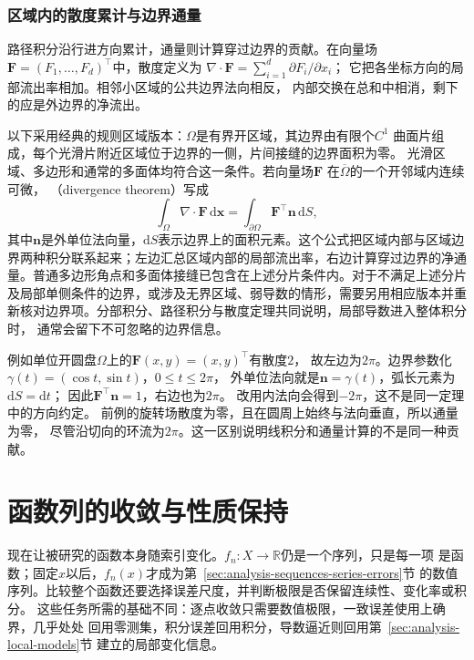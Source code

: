 \subsubsection{区域内的散度累计与边界通量}
路径积分沿行进方向累计，通量则计算穿过边界的贡献。在向量场
$\bm F=(F_1,\ldots,F_d)^\top$中，散度定义为
$\nabla\mathbin{\cdot}\bm F=\sum_{i=1}^d\partial F_i/\partial x_i$；
它把各坐标方向的局部流出率相加。相邻小区域的公共边界法向相反，
内部交换在总和中相消，剩下的应是外边界的净流出。

以下采用经典的规则区域版本：$\Omega$是有界开区域，其边界由有限个$C^1$
曲面片组成，每个光滑片附近区域位于边界的一侧，片间接缝的边界面积为零。
光滑区域、多边形和通常的多面体均符合这一条件。若向量场$\bm{F}$
在$\overline{\Omega}$的一个开邻域内连续可微，
（divergence theorem）写成
\begin{equation}
  \int_{\Omega}\nabla\mathbin{\cdot}\bm{F}\,\mathrm{d}\bm{x}
  =
  \int_{\partial\Omega}\bm{F}^{\top}\bm{n}\,\mathrm{d}S,
\label{eq:analysis-divergence-theorem}
\end{equation}
其中$\bm{n}$是外单位法向量，$\mathrm dS$表示边界上的面积元素。这个公式把区域内部与区域边界两种积分联系起来；左边汇总区域内部的局部流出率，右边计算穿过边界的净通量。普通多边形角点和多面体接缝已包含在上述分片条件内。对于不满足上述分片及局部单侧条件的边界，或涉及无界区域、弱导数的情形，需要另用相应版本并重新核对边界项。分部积分、路径积分与散度定理共同说明，局部导数进入整体积分时， 通常会留下不可忽略的边界信息。

例如单位开圆盘$\Omega$上的$\bm F(x,y)=(x,y)^\top$有散度$2$，
故左边为$2\pi$。边界参数化$\gamma(t)=(\cos t,\sin t)$，$0\leq t\leq2\pi$，
外单位法向就是$\bm n=\gamma(t)$，弧长元素为$\mathrm dS=\mathrm dt$；
因此$\bm F^\top\bm n=1$，右边也为$2\pi$。
改用内法向会得到$-2\pi$，这不是同一定理中的方向约定。
前例的旋转场散度为零，且在圆周上始终与法向垂直，所以通量为零，
尽管沿切向的环流为$2\pi$。这一区别说明线积分和通量计算的不是同一种贡献。

\section{函数列的收敛与性质保持}
\label{sec:analysis-function-convergence-essential-bounds}

现在让被研究的函数本身随索引变化。$f_n:X\to\mathbb R$仍是一个序列，只是每一项
是函数；固定$x$以后，$f_n(x)$才成为第~\ref{sec:analysis-sequences-series-errors}节
的数值序列。比较整个函数还要选择误差尺度，并判断极限是否保留连续性、变化率或积分。
这些任务所需的基础不同：逐点收敛只需要数值极限，一致误差使用上确界，几乎处处
回用零测集，积分误差回用积分，导数逼近则回用第~\ref{sec:analysis-local-models}节
建立的局部变化信息。

